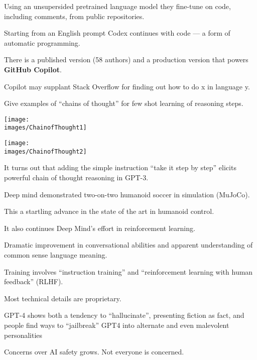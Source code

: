 {{Using an {\color{red} unsupersided pretrained language model} they fine-tune on code, including comments, from public repositories.

\vfill
Starting from an English prompt Codex continues with code --- a form of automatic programming.

\vfill
There is a published version (58 authors) and a production version that powers {\bf GitHub Copilot}.

\vfill
Copilot may supplant Stack Overflow for finding out how to do x in language y.


Give examples of {\color{red} ``chains of thought''} for few shot learning of reasoning steps.


\centerline{\texttt{[image: \\images/ChainofThought1]}}


\centerline{\texttt{[image: \\images/ChainofThought2]}}


It turns out that adding the simple instruction ``take it step by step'' elicits powerful chain of thought reasoning in GPT-3.


Deep mind demonstrated two-on-two humanoid soccer in simulation (MuJoCo).

\vfill
This a startling advance in the state of the art in humanoid control.

\vfill
It also continues Deep Mind's effort in reinforcement learning.


Dramatic improvement in conversational abilities and apparent understanding of common sense language meaning.

\vfill
Training involves ``instruction training'' and ``reinforcement learning with human feedback'' (RLHF).

\vfill
Most technical details are proprietary.

\vfill
GPT-4 shows both a tendency to ``hallucinate'', presenting fiction as fact,
and people find ways to ``jailbreak'' GPT4 into alternate and even malevolent personalities 

\vfill
Concerns over AI safety grows. Not everyone is concerned.

}}
